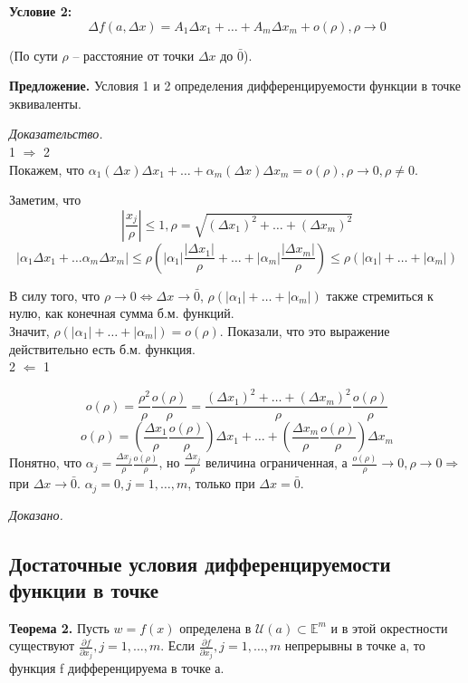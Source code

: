 \documentclass[a4paper,14pt]{article} %
\begin{document}
	\textbf{Условие 2:}
	 \[\Delta f(a, \Delta x) = A_1 \Delta x_1 + \ldots + A_m \Delta x_m + o(\rho), \rho\to 0\]  
	 \begin{center}
	 (По сути $\rho$ -- расстояние от точки $\Delta x$ до $\bar0$).
	 \end{center}
	
	\textbf{Предложение.} Условия 1 и 2 определения дифференцируемости функции в точке эквиваленты.
	
	\textit{Доказательство.}\\
	1 $\Rightarrow$ 2\\
	Покажем, что $\alpha_1(\Delta x)\Delta x_1 + \ldots + \alpha_m(\Delta x)\Delta x_m = o(\rho), \rho \rightarrow 0, \rho \not= 0$.
	
	Заметим, что \[|\frac{x_j}{\rho}| \leq 1, \rho = \sqrt{(\Delta x_1)^2 + \ldots + (\Delta x_m)^2}\]
	\[|\alpha_1\Delta x_1 + \ldots \alpha_m\Delta x_m| \leq \rho(|\alpha_1|\frac{|\Delta x_1|}{\rho} + \ldots + |\alpha_m|\frac{|\Delta x_m|}{\rho}) \leq \rho(|\alpha_1| + \ldots + |\alpha_m|)\]
	
	В силу того, что $\rho \to 0 \Leftrightarrow \Delta x \to \bar0$, $\rho(|\alpha_1| + \ldots + |\alpha_m|)$ также стремиться к нулю, как конечная сумма б.м. функций.\\
	Значит, $\rho(|\alpha_1| + \ldots + |\alpha_m|) = o(\rho)$. Показали, что это выражение действительно есть б.м. функция.\\
	2 $\Leftarrow$ 1 
	
	\[o(\rho) = \frac{\rho^2}{\rho} \frac{o(\rho)}{\rho} = \frac{(\Delta x_1)^2 + \ldots + (\Delta x_m)^2}{\rho} \frac{o(\rho)}{\rho}\]
	\[o(\rho) = (\frac{\Delta x_1}{\rho}\frac{o(\rho)}{\rho})\Delta x_1 + \ldots + (\frac{\Delta x_m}{\rho}\frac{o(\rho)}{\rho})\Delta x_m \]
	Понятно, что $\alpha_j = \frac{\Delta x_j}{\rho}\frac{o(\rho)}{\rho}$, но $\frac {\Delta x_j}{\rho}$ величина ограниченная, а $\frac {o(\rho)}{\rho} \to 0, \rho \to 0 \Rightarrow $ при $\Delta x \to \bar 0$.
	$\alpha_j = 0, j = 1, \ldots, m$, только при $\Delta x = \bar0$.
	
	\textit{Доказано.}
	
	
	 \subsection*{Достаточные условия дифференцируемости функции в точке}
	 
	 \textbf{Теорема 2.} Пусть $w = f(x)$ определена в $\mathscr{U}(a) \subset \mathds{E}^m$
	 и в этой окрестности существуют $\frac{\partial f}{\partial x_j}, j = 1, \ldots, m$. 
	 Если  $\frac{\partial f}{\partial x_j}, j = 1, \ldots, m$ непрерывны в точке а, то функция f дифференцируема в точке а.\\
	 
\end{document}
